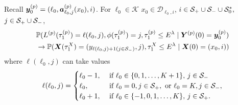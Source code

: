 \begin{cor}\label{cor: aln222} Recall \(\boldsymbol y_{0}^{(p)} = (\ell_0, \boldsymbol a_{\ell_0,j}^{(p)}(x_0), i)\). For \(\ell_0\in\mathcal K\) \(x_0\in\mathcal D_{\ell_0,i}\), \(i\in\mathcal S_+\cup\mathcal{S}_-\cup\mathcal{S}_{0}^{*},\) \(j\in\mathcal{S}_+\cup\mathcal{S}_-\), 
	\begin{align}
		&\mathbb P(L^{(p)}(\tau_1^{(p)}) = \ell(\ell_0,j), \phi(\tau_1^{(p)}) = j, \tau_{1}^{(p)}\leq E^\lambda 
            	 \mid \boldsymbol Y^{(p)}(0) = \boldsymbol y_0^{(p)}) \nonumber
		\\&\to \mathbb P(\boldsymbol X(\tau_1^X) = (y_{\ell(\ell_0,j)+1(j\in\mathcal{S}_-)}, j), \tau_{1}^X\leq E^\lambda 
            	 \mid \boldsymbol X(0) = (x_0,i))\label{eqn: 1421}
	\end{align}
	where \(\ell(\ell_0,j)\) can take values
	\begin{align*}
		\ell(\ell_0,j) = \begin{cases}
			\ell_0-1, &\mbox{ if } \ell_0\in\{0,1,\dots,K+1\},\, j\in\mathcal{S}_-\\
			\ell_0, & \mbox{ if } \ell_0 = 0, j\in\mathcal S_+, \mbox{ or }\ell_0 = K, j\in\mathcal S_-,\\
			\ell_0+1, & \mbox{ if } \ell_0\in\{-1,0,1,\dots,K\},\, j\in\mathcal{S}_+.
		\end{cases}
	\end{align*}
\end{cor}
